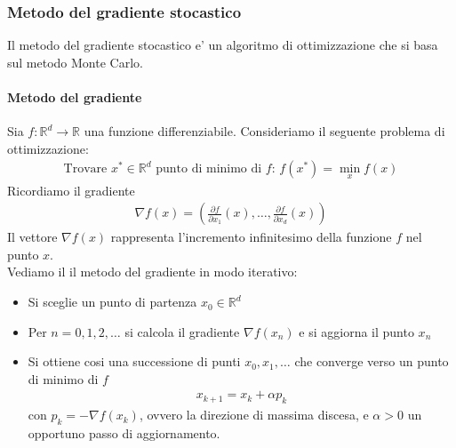 \documentclass[a4paper,12pt]{article}
\begin{document}
\subsubsection{Metodo del gradiente stocastico}
Il metodo del gradiente stocastico e' un algoritmo di ottimizzazione che si basa sul metodo Monte Carlo.\\
\paragraph{Metodo del gradiente} Sia $f: \mathbb{R}^d \to \mathbb{R}$ una funzione differenziabile. Consideriamo il seguente problema di ottimizzazione:
\begin{align}
  \text{Trovare } x^* \in \mathbb{R}^d \text{ punto di minimo di } f: \, f(x^*) = \min_x f(x)
\end{align}
Ricordiamo il gradiente
\begin{align}
  \nabla f(x) = \left( \frac{\partial f}{\partial x_1}(x), \ldots, \frac{\partial f}{\partial x_d}(x) \right)
\end{align}
Il vettore $\nabla f(x)$ rappresenta l’incremento infinitesimo della funzione $f$ nel punto $x$.\\ 
Vediamo il il metodo del gradiente in modo iterativo:
\begin{itemize}
  \item Si sceglie un punto di partenza $x_0 \in \mathbb{R}^d$
  \item Per $n=0,1,2,\ldots$ si calcola il gradiente $\nabla f(x_n)$ e si aggiorna il punto $x_n$
  \item Si ottiene cosi una successione di punti $x_0, x_1, \ldots$ che converge verso un punto di minimo di $f$
  \begin{align*}
    x_{k+1} = x_k + \alpha p_k
  \end{align*}
  con $p_k = -\nabla f(x_k)$, ovvero la direzione di massima discesa, e $\alpha > 0$ un opportuno passo di aggiornamento.
\end{itemize}
\end{document}
